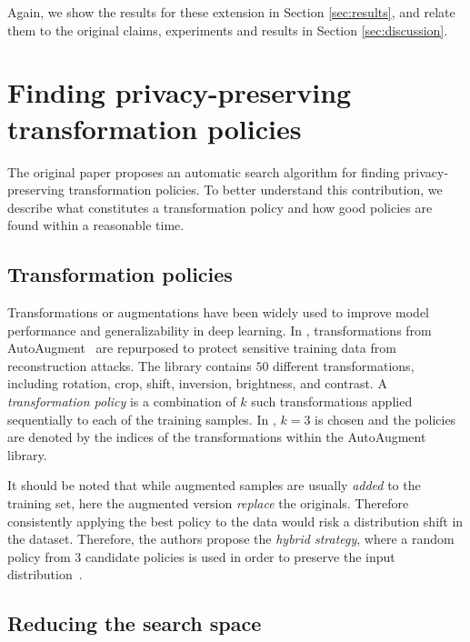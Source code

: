 Again, we show the results for these extension in Section \ref{sec:results}, and relate them to the original claims, experiments and results in Section \ref{sec:discussion}.


\section{Finding privacy-preserving transformation policies}

The original paper proposes an automatic search algorithm for finding privacy-preserving transformation policies. To better understand this contribution, we describe what constitutes a transformation policy and how good policies are found within a reasonable time.

\subsection{Transformation policies}

Transformations or augmentations have been widely used to improve model performance and generalizability in deep learning. In \cite{gao2021privacy}, transformations from AutoAugment~\cite{cubuk2019autoaugment} are repurposed to protect sensitive training data from reconstruction attacks. The library contains $50$ different transformations, including rotation, crop, shift, inversion, brightness, and contrast. A \emph{transformation policy} is a combination of $k$ such transformations applied sequentially to each of the training samples. In \cite{gao2021privacy}, $k=3$ is chosen and the policies are denoted by the indices of the transformations within the AutoAugment library.

It should be noted that while augmented samples are usually \emph{added} to the training set, here the augmented version \emph{replace} the originals. Therefore consistently applying the best policy to the data would risk a distribution shift in the dataset. Therefore, the authors propose the \emph{hybrid strategy}, where a random policy from $3$ candidate policies is used in order to preserve the input distribution~\cite{gao2021privacy}.

\subsection{Reducing the search space}
\label{sec:3.2search}

